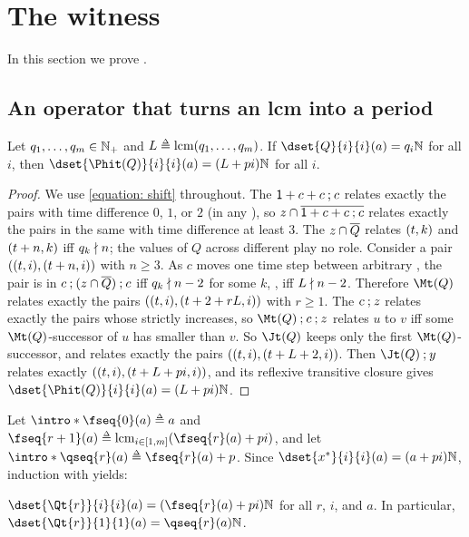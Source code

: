 \section{The witness}\label{section: witness}

In this section we prove .

\subsection{An operator that turns an lcm into a period}\label{section: witness operator}
\begin{lemma}\label{lemma: one step}
    Let $q_1, \dots, q_m \in \mathbb{N}_{+}$ and $L \defeq \lcm(q_1, \dots, q_m)$.
    If $\dset{Q}{i}{i}(a) = q_i \nat$ for all $i$, then $\dset{\Phit(Q)}{i}{i}(a) = (L + p i) \nat$ for all $i$.
\end{lemma}
\begin{proof}
    We use \eqref{equation: shift} throughout.
    The  $\mathsf{1} \mathbin{+} c \mathbin{+} c \mathbin{;} c$ relates exactly the pairs with time difference $0$, $1$, or $2$ (in any ), so $z \mathbin{\cap} \overline{\mathsf{1} \mathbin{+} c \mathbin{+} c \mathbin{;} c}$ relates exactly the pairs in the same  with time difference at least $3$.
    The  $z \mathbin{\cap} \overline{Q}$ relates $(t, k)$ and $(t + n, k)$ iff $q_k \nmid n$; the values of $Q$ across different  play no role.
    Consider a pair $((t, i), (t + n, i))$ with $n \ge 3$.
    As $c$ moves one time step between arbitrary ,
    the pair is in $c \mathbin{;} (z \mathbin{\cap} \overline{Q}) \mathbin{;} c$ iff $q_k \nmid n - 2$ for some $k$, \ie, iff $L \nmid n - 2$.
    Therefore $\Mt(Q)$ relates exactly the pairs $((t, i), (t + 2 + r L, i))$ with $r \ge 1$.
    The  $c \mathbin{;} z$ relates exactly the pairs whose  strictly increases, so $\Mt(Q) \compo c \compo z$ relates $u$ to $v$ iff some $\Mt(Q)$-successor of $u$ has smaller  than $v$.
    So $\Jt(Q)$ keeps only the first $\Mt(Q)$-successor, and relates exactly the pairs $((t, i), (t + L + 2, i))$.
    Then $\Jt(Q) \compo y$ relates exactly $((t, i), (t + L + p i, i))$, and its reflexive transitive closure gives $\dset{\Phit(Q)}{i}{i}(a) = (L + p i) \nat$.
\end{proof}

\AP Let $\intro*\fseq{0}(a) \defeq a$ and $\fseq{r+1}(a) \defeq \lcm_{i \in \range{1, m}} (\fseq{r}(a) + p i)$, and let $\intro*\qseq{r}(a) \defeq \fseq{r}(a) + p$.
Since $\dset{x^{*}}{i}{i}(a) = (a + p i) \nat$, induction with  yields:
\begin{corollary}\label{corollary: witness periods}
    $\dset{\Qt{r}}{i}{i}(a) = (\fseq{r}(a) + p i) \nat$ for all $r$, $i$, and $a$. In particular, $\dset{\Qt{r}}{1}{1}(a) = \qseq{r}(a) \nat$.
\end{corollary}

